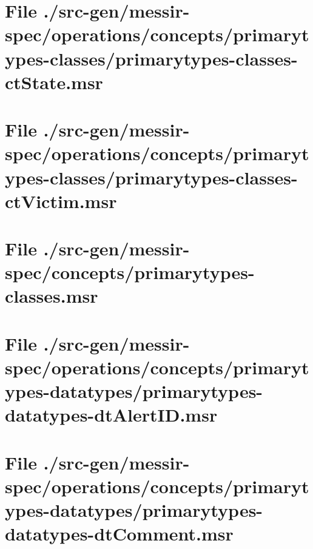 \section[File /src-gen/messir-spec/operations.../primarytypes-classes-ctState.msr]{File ./src-gen/messir-spec/operations/concepts/primarytypes-classes/primarytypes-classes-ctState.msr}
\scriptsize

\normalsize
	
\section[File /src-gen/messir-spec/operations.../primarytypes-classes-ctVictim.msr]{File ./src-gen/messir-spec/operations/concepts/primarytypes-classes/primarytypes-classes-ctVictim.msr}
\scriptsize

\normalsize
	
\section[File /src-gen/messir-spec/concepts/primarytypes-classes.msr]{File ./src-gen/messir-spec/concepts/primarytypes-classes.msr}
\scriptsize

\normalsize
	
\section[File /src-gen/messir-spec/operations.../primarytypes-datatypes-dtAlertID.msr]{File ./src-gen/messir-spec/operations/concepts/primarytypes-datatypes/primarytypes-datatypes-dtAlertID.msr}
\scriptsize

\normalsize
	
\section[File /src-gen/messir-spec/operations.../primarytypes-datatypes-dtComment.msr]{File ./src-gen/messir-spec/operations/concepts/primarytypes-datatypes/primarytypes-datatypes-dtComment.msr}
\scriptsize

\normalsize
	
